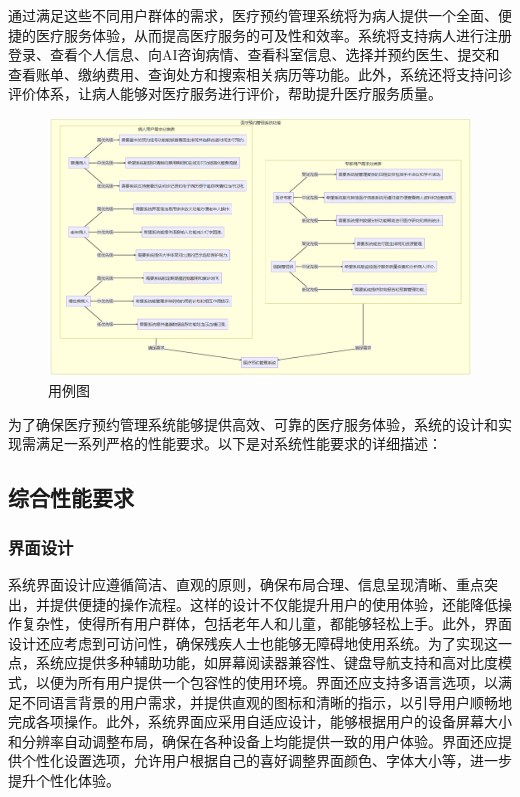 通过满足这些不同用户群体的需求，医疗预约管理系统将为病人提供一个全面、便捷的医疗服务体验，从而提高医疗服务的可及性和效率。系统将支持病人进行注册登录、查看个人信息、向AI咨询病情、查看科室信息、选择并预约医生、提交和查看账单、缴纳费用、查询处方和搜索相关病历等功能。此外，系统还将支持问诊评价体系，让病人能够对医疗服务进行评价，帮助提升医疗服务质量。

\begin{figure}[htbp]
	\centering
	\includegraphics[width=\textwidth]{figures/03.png}
	\caption{用例图}
\end{figure}

为了确保医疗预约管理系统能够提供高效、可靠的医疗服务体验，系统的设计和实现需满足一系列严格的性能要求。以下是对系统性能要求的详细描述：

\subsection{综合性能要求}

\subsubsection{界面设计}
系统界面设计应遵循简洁、直观的原则，确保布局合理、信息呈现清晰、重点突出，并提供便捷的操作流程。这样的设计不仅能提升用户的使用体验，还能降低操作复杂性，使得所有用户群体，包括老年人和儿童，都能够轻松上手。此外，界面设计还应考虑到可访问性，确保残疾人士也能够无障碍地使用系统。为了实现这一点，系统应提供多种辅助功能，如屏幕阅读器兼容性、键盘导航支持和高对比度模式，以便为所有用户提供一个包容性的使用环境。界面还应支持多语言选项，以满足不同语言背景的用户需求，并提供直观的图标和清晰的指示，以引导用户顺畅地完成各项操作。此外，系统界面应采用自适应设计，能够根据用户的设备屏幕大小和分辨率自动调整布局，确保在各种设备上均能提供一致的用户体验。界面还应提供个性化设置选项，允许用户根据自己的喜好调整界面颜色、字体大小等，进一步提升个性化体验。

